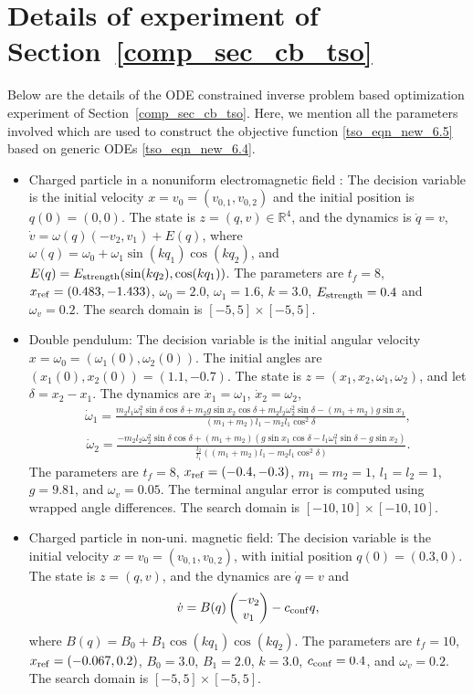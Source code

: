 \documentclass{article}
\numberwithin{equation}{section}
\begin{document}
\section{Details of experiment of Section~\ref{comp_sec_cb_tso}}\label{detal_exp_appendix}
Below are the details of the ODE constrained inverse problem based optimization experiment of Section~\ref{comp_sec_cb_tso}. Here, we mention all the parameters involved which are used to construct the objective function \eqref{tso_eqn_new_6.5} based on generic ODEs \eqref{tso_eqn_new_6.4}. 
\begin{itemize}
    \item
Charged particle in a nonuniform electromagnetic field : The decision variable is the initial velocity $x=v_0=(v_{0,1},v_{0,2})$
and the initial position is $q(0)=(0,0)$. The state is $z=(q,v)\in\mathbb R^4$, and the dynamics is $\dot q=v$, $\dot v= \omega(q) (-v_2, v_1) + E(q)$, where $\omega(q) = \omega_0+\omega_1\sin(kq_1)\cos(kq_2)$, and $
    E(q) =
    E_{\rm strength}(\sin(kq_2), \cos(kq_1))$. 
The parameters are $t_f =8$, $x_{\rm ref}=(0.483,-1.433)$, $\omega_0=2.0$,
    $\omega_1=1.6$, $k=3.0$, $E_{\rm strength}=0.4$ 
and $\omega_v=0.2$. The search domain is $[-5,5]\times[-5,5]$. 

\item Double pendulum: The decision variable is the initial angular velocity $x = \omega_0 = (\omega_1(0), \omega_2(0))$. The initial angles are $(x_1(0), x_2(0)) = (1.1, -0.7)$. The state is $z = (x_1, x_2, \omega_1, \omega_2)$, and let $\delta = x_2 - x_1$. The dynamics are $\dot{x}_1 = \omega_1$, $\dot{x}_2 = \omega_2$,
\begin{align}
    \dot\omega_1 = \frac{m_2 l_1\omega_1^2\sin\delta\cos\delta + m_2g\sin x_2\cos\delta + m_2l_2\omega_2^2\sin\delta - (m_1+m_2)g\sin x_1}{(m_1+m_2)l_1-m_2l_1\cos^2\delta},
\end{align}
\begin{align}
    \dot\omega_2 = \frac{-m_2l_2\omega_2^2\sin\delta\cos\delta + (m_1+m_2)(g\sin x_1\cos\delta - l_1\omega_1^2\sin\delta - g\sin x_2)}{\frac{l_2}{l_1}((m_1+m_2)l_1-m_2l_1\cos^2\delta)}.
\end{align}
The parameters are $t_f = 8$, $x_{\rm ref} = (-0.4, -0.3)$, $m_1 = m_2 = 1$, $l_1 = l_2 = 1$, $g = 9.81$, and $\omega_v = 0.05$. The terminal angular error is computed using wrapped angle differences. The search domain is $[-10, 10] \times [-10, 10]$.

\item Charged particle in non-uni. magnetic field: The decision variable is the initial velocity $x = v_0 = (v_{0,1}, v_{0,2})$, with initial position $q(0) = (0.3, 0)$. The state is $z = (q, v)$, and the dynamics are $\dot{q} = v$ and
\begin{align}
    \dot{v} = B(q) \begin{pmatrix} -v_2 \\ v_1 \end{pmatrix} - c_{\rm conf}q,
\end{align}
where $B(q) = B_0 + B_1\cos(kq_1)\cos(kq_2)$. The parameters are $t_f = 10$, $x_{\rm ref} = (-0.067, 0.2)$, $B_0 = 3.0$, $B_1 = 2.0$, $k = 3.0$, $c_{\rm conf} = 0.4$, and $\omega_v = 0.2$. The search domain is $[-5, 5] \times [-5, 5]$.



\end{itemize}
\end{document}
